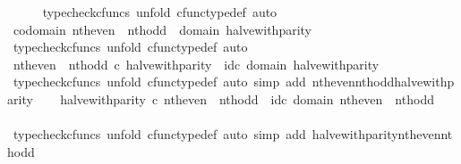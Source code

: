 \begin{isabellebody}
\ \ \ \ \isamarkupfalse%
\ {\isacharparenleft}{\kern0pt}typecheck{\isacharunderscore}{\kern0pt}cfuncs{\isacharcomma}{\kern0pt}\ unfold\ cfunc{\isacharunderscore}{\kern0pt}type{\isacharunderscore}{\kern0pt}def{\isacharcomma}{\kern0pt}\ auto{\isacharparenright}{\kern0pt}\isanewline
\ \ \isamarkupfalse%
\ {\isachardoublequoteopen}codomain\ {\isacharparenleft}{\kern0pt}nth{\isacharunderscore}{\kern0pt}even\ {\isasymamalg}\ nth{\isacharunderscore}{\kern0pt}odd{\isacharparenright}{\kern0pt}\ {\isacharequal}{\kern0pt}\ domain\ halve{\isacharunderscore}{\kern0pt}with{\isacharunderscore}{\kern0pt}parity{\isachardoublequoteclose}\isanewline
\ \ \ \ \isamarkupfalse%
\ {\isacharparenleft}{\kern0pt}typecheck{\isacharunderscore}{\kern0pt}cfuncs{\isacharcomma}{\kern0pt}\ unfold\ cfunc{\isacharunderscore}{\kern0pt}type{\isacharunderscore}{\kern0pt}def{\isacharcomma}{\kern0pt}\ auto{\isacharparenright}{\kern0pt}\isanewline
\ \ \isamarkupfalse%
\ {\isachardoublequoteopen}nth{\isacharunderscore}{\kern0pt}even\ {\isasymamalg}\ nth{\isacharunderscore}{\kern0pt}odd\ {\isasymcirc}\isactrlsub c\ halve{\isacharunderscore}{\kern0pt}with{\isacharunderscore}{\kern0pt}parity\ {\isacharequal}{\kern0pt}\ id\isactrlsub c\ {\isacharparenleft}{\kern0pt}domain\ halve{\isacharunderscore}{\kern0pt}with{\isacharunderscore}{\kern0pt}parity{\isacharparenright}{\kern0pt}{\isachardoublequoteclose}\isanewline
\ \ \ \ \isamarkupfalse%
\ {\isacharparenleft}{\kern0pt}typecheck{\isacharunderscore}{\kern0pt}cfuncs{\isacharcomma}{\kern0pt}\ unfold\ cfunc{\isacharunderscore}{\kern0pt}type{\isacharunderscore}{\kern0pt}def{\isacharcomma}{\kern0pt}\ auto\ simp\ add{\isacharcolon}{\kern0pt}\ nth{\isacharunderscore}{\kern0pt}even{\isacharunderscore}{\kern0pt}nth{\isacharunderscore}{\kern0pt}odd{\isacharunderscore}{\kern0pt}halve{\isacharunderscore}{\kern0pt}with{\isacharunderscore}{\kern0pt}parity{\isacharparenright}{\kern0pt}\isanewline
\ \ \isamarkupfalse%
\ {\isachardoublequoteopen}halve{\isacharunderscore}{\kern0pt}with{\isacharunderscore}{\kern0pt}parity\ {\isasymcirc}\isactrlsub c\ nth{\isacharunderscore}{\kern0pt}even\ {\isasymamalg}\ nth{\isacharunderscore}{\kern0pt}odd\ {\isacharequal}{\kern0pt}\ id\isactrlsub c\ {\isacharparenleft}{\kern0pt}domain\ {\isacharparenleft}{\kern0pt}nth{\isacharunderscore}{\kern0pt}even\ {\isasymamalg}\ nth{\isacharunderscore}{\kern0pt}odd{\isacharparenright}{\kern0pt}{\isacharparenright}{\kern0pt}{\isachardoublequoteclose}\isanewline
\ \ \ \ \isamarkupfalse%
\ {\isacharparenleft}{\kern0pt}typecheck{\isacharunderscore}{\kern0pt}cfuncs{\isacharcomma}{\kern0pt}\ unfold\ cfunc{\isacharunderscore}{\kern0pt}type{\isacharunderscore}{\kern0pt}def{\isacharcomma}{\kern0pt}\ auto\ simp\ add{\isacharcolon}{\kern0pt}\ halve{\isacharunderscore}{\kern0pt}with{\isacharunderscore}{\kern0pt}parity{\isacharunderscore}{\kern0pt}nth{\isacharunderscore}{\kern0pt}even{\isacharunderscore}{\kern0pt}nth{\isacharunderscore}{\kern0pt}odd{\isacharparenright}{\kern0pt}\isanewline

\end{isabellebody}
